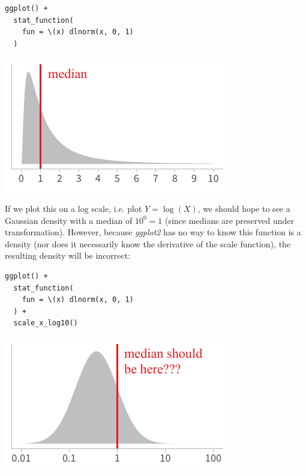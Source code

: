 \documentclass[journal]{vgtc}              %
\begin{document}
\noindent
\begin{minipage}{.5\columnwidth}
\small
\begin{verbatim}
ggplot() +
  stat_function(
    fun = \(x) dlnorm(x, 0, 1)
  )
\end{verbatim}
\end{minipage}%
  \begin{minipage}{.4\columnwidth}
    \centering
    \includegraphics[width=1.2\columnwidth]{figs/3-jacobian-lognorm.pdf}
  \end{minipage}
\hfill\break


If we plot this on a log scale, i.e. plot $Y = \log(X)$, we should hope to see a Gaussian density with a median of $10^0 = 1$ (since medians are preserved under transformation). However, because \textit{ggplot2} has no way to know this function is a density (nor does it necessarily know the derivative of the scale function), the resulting density will be incorrect:

\noindent
\begin{minipage}{.5\columnwidth}
\small
\begin{verbatim}
ggplot() +
  stat_function(
    fun = \(x) dlnorm(x, 0, 1)
  ) +
  scale_x_log10()
\end{verbatim}
\end{minipage}%
  \begin{minipage}{.4\columnwidth}
    \centering
    \includegraphics[width=1.2\columnwidth]{figs/3-jacobian-incorrect.pdf}
  \end{minipage}
\hfill\break
\end{document}
